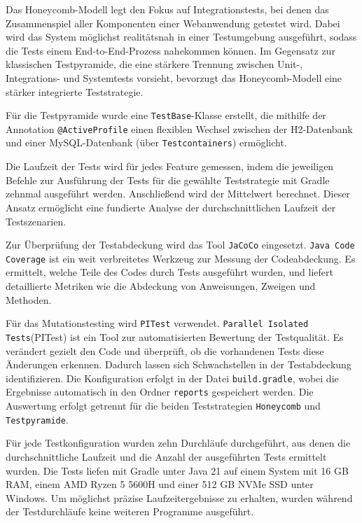 Das Honeycomb-Modell legt den Fokus auf Integrationstests, bei denen das Zusammenspiel aller Komponenten einer Webanwendung getestet wird. Dabei wird das System möglichst realitätsnah in einer Testumgebung ausgeführt, sodass die Tests einem End-to-End-Prozess nahekommen können. Im Gegensatz zur klassischen Testpyramide, die eine stärkere Trennung zwischen Unit-, Integrations- und Systemtests vorsieht, bevorzugt das Honeycomb-Modell eine stärker integrierte Teststrategie.

Für die Testpyramide wurde eine \texttt{TestBase}-Klasse erstellt, die mithilfe der Annotation \texttt{@ActiveProfile} einen flexiblen Wechsel zwischen der H2-Datenbank und einer MySQL-Datenbank (über \texttt{Testcontainers}) ermöglicht.

Die Laufzeit der Tests wird für jedes Feature gemessen, indem die jeweiligen Befehle zur Ausführung der Tests für die gewählte Teststrategie mit Gradle zehnmal ausgeführt werden. Anschließend wird der Mittelwert berechnet. Dieser Ansatz ermöglicht eine fundierte Analyse der durchschnittlichen Laufzeit der Testszenarien.

Zur Überprüfung der Testabdeckung wird das Tool \texttt{JaCoCo} eingesetzt. \texttt{Java Code Coverage} ist ein weit verbreitetes Werkzeug zur Messung der Codeabdeckung. Es ermittelt, welche Teile des Codes durch Tests ausgeführt wurden, und liefert detaillierte Metriken wie die Abdeckung von Anweisungen, Zweigen und Methoden.  

Für das Mutationstesting wird \texttt{PITest} verwendet. \texttt{Parallel Isolated Tests}(PITest) ist ein Tool zur automatisierten Bewertung der Testqualität. Es verändert gezielt den Code und überprüft, ob die vorhandenen Tests diese Änderungen erkennen. Dadurch lassen sich Schwachstellen in der Testabdeckung identifizieren. Die Konfiguration erfolgt in der Datei \texttt{build.gradle}, wobei die Ergebnisse automatisch in den Ordner \texttt{reports} gespeichert werden. Die Auswertung erfolgt getrennt für die beiden Teststrategien \texttt{Honeycomb} und \texttt{Testpyramide}.

Für jede Testkonfiguration wurden zehn Durchläufe durchgeführt, aus denen die durchschnittliche Laufzeit und die Anzahl der ausgeführten Tests ermittelt wurden. Die Tests liefen mit Gradle unter Java 21 auf einem System mit 16 GB RAM, einem AMD Ryzen 5 5600H und einer 512 GB NVMe SSD unter Windows. Um möglichst präzise Laufzeitergebnisse zu erhalten, wurden während der Testdurchläufe keine weiteren Programme ausgeführt.

